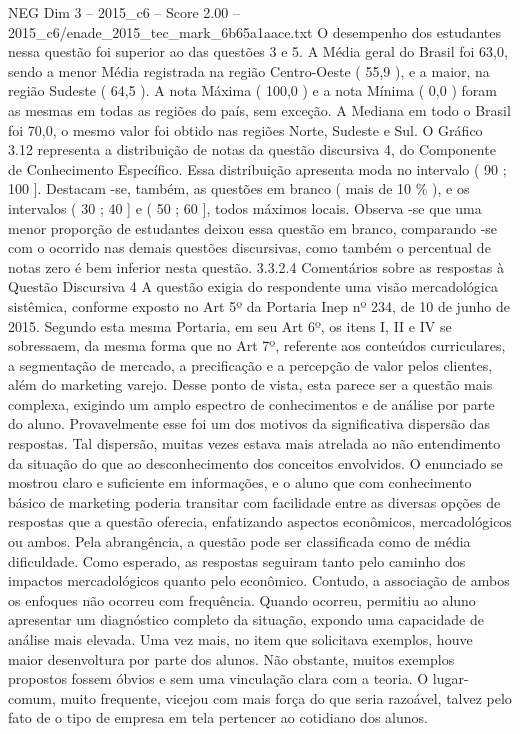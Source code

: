 \begin{textsample}{NEG Dim 3 – 2015\_c6 – Score 2.00 – 2015\_c6/enade\_2015\_tec\_mark\_6b65a1aace.txt}
O desempenho dos estudantes nessa questão foi superior ao das questões 3 e 5.
A Média geral do Brasil foi 63,0, sendo a menor Média registrada na região Centro-Oeste ( 55,9 ), e a maior, na região Sudeste ( 64,5 ).
A nota Máxima ( 100,0 ) e a nota Mínima ( 0,0 ) foram as mesmas em todas as regiões do país, sem exceção.
A Mediana em todo o Brasil foi 70,0, o mesmo valor foi obtido nas regiões Norte, Sudeste e Sul.
O Gráfico 3.12 representa a distribuição de notas da questão discursiva 4, do Componente de Conhecimento Específico.
Essa distribuição apresenta moda no intervalo ( 90 ; 100 ].
Destacam -se, também, as questões em branco ( mais de 10 \% ), e os intervalos ( 30 ; 40 ] e ( 50 ; 60 ], todos máximos locais.
Observa -se que uma menor proporção de estudantes deixou essa questão em branco, comparando -se com o ocorrido nas demais questões discursivas, como também o percentual de notas zero é bem inferior nesta questão. 3.3.2.4 Comentários sobre as respostas à Questão Discursiva 4 A questão exigia do respondente uma visão mercadológica sistêmica, conforme exposto no Art 5º da Portaria Inep nº 234, de 10 de junho de 2015.
Segundo esta mesma Portaria, em seu Art 6º, os itens I, II e IV se sobressaem, da mesma forma que no Art 7º, referente aos conteúdos curriculares, a segmentação de mercado, a precificação e a percepção de valor pelos clientes, além do marketing varejo.
Desse ponto de vista, esta parece ser a questão mais complexa, exigindo um amplo espectro de conhecimentos e de análise por parte do aluno.
Provavelmente esse foi um dos motivos da significativa dispersão das respostas.
Tal dispersão, muitas vezes estava mais atrelada ao não entendimento da situação do que ao desconhecimento dos conceitos envolvidos.
O enunciado se mostrou claro e suficiente em informações, e o aluno que com conhecimento básico de marketing poderia transitar com facilidade entre as diversas opções de respostas que a questão oferecia, enfatizando aspectos econômicos, mercadológicos ou ambos.
Pela abrangência, a questão pode ser classificada como de média dificuldade.
Como esperado, as respostas seguiram tanto pelo caminho dos impactos mercadológicos quanto pelo econômico.
Contudo, a associação de ambos os enfoques não ocorreu com frequência.
Quando ocorreu, permitiu ao aluno apresentar um diagnóstico completo da situação, expondo uma capacidade de análise mais elevada.
Uma vez mais, no item que solicitava exemplos, houve maior desenvoltura por parte dos alunos.
Não obstante, muitos exemplos propostos fossem óbvios e sem uma vinculação clara com a teoria.
O lugar-comum, muito frequente, vicejou com mais força do que seria razoável, talvez pelo fato de o tipo de empresa em tela pertencer ao cotidiano dos alunos.

\end{textsample}
